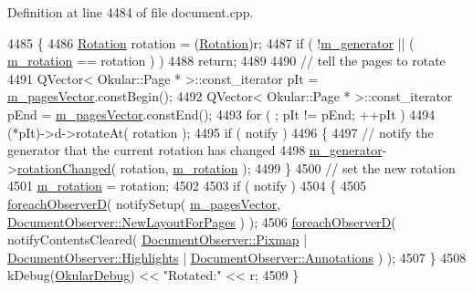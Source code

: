 Definition at line 4484 of file document.\+cpp.


\begin{DoxyCode}
4485 \{
4486     \hyperlink{namespaceOkular_a8556d00465f61ef533c6b027669e7da6}{Rotation} rotation = (\hyperlink{namespaceOkular_a8556d00465f61ef533c6b027669e7da6}{Rotation})r;
4487     \textcolor{keywordflow}{if} ( !\hyperlink{classOkular_1_1DocumentPrivate_a52083f79ce95756ddea060e74315e91f}{m\_generator} || ( \hyperlink{classOkular_1_1DocumentPrivate_a5b7f4c2b5937d311b277c2e90826ee1b}{m\_rotation} == rotation ) )
4488     \textcolor{keywordflow}{return};
4489 
4490     \textcolor{comment}{// tell the pages to rotate}
4491     QVector< Okular::Page * >::const\_iterator pIt = \hyperlink{classOkular_1_1DocumentPrivate_a73b852d9a73ffe8061b66dbf9b290f17}{m\_pagesVector}.constBegin();
4492     QVector< Okular::Page * >::const\_iterator pEnd = \hyperlink{classOkular_1_1DocumentPrivate_a73b852d9a73ffe8061b66dbf9b290f17}{m\_pagesVector}.constEnd();
4493     \textcolor{keywordflow}{for} ( ; pIt != pEnd; ++pIt )
4494         (*pIt)->d->rotateAt( rotation );
4495     \textcolor{keywordflow}{if} ( notify )
4496     \{
4497         \textcolor{comment}{// notify the generator that the current rotation has changed}
4498         \hyperlink{classOkular_1_1DocumentPrivate_a52083f79ce95756ddea060e74315e91f}{m\_generator}->\hyperlink{classOkular_1_1Generator_a46e155b74cccf91f48ad58eafcc7a716}{rotationChanged}( rotation, 
      \hyperlink{classOkular_1_1DocumentPrivate_a5b7f4c2b5937d311b277c2e90826ee1b}{m\_rotation} );
4499     \}
4500     \textcolor{comment}{// set the new rotation}
4501     \hyperlink{classOkular_1_1DocumentPrivate_a5b7f4c2b5937d311b277c2e90826ee1b}{m\_rotation} = rotation;
4502 
4503     \textcolor{keywordflow}{if} ( notify )
4504     \{
4505         \hyperlink{core_2document_8cpp_a213572010703f4fcbc3229b09d665d3c}{foreachObserverD}( notifySetup( \hyperlink{classOkular_1_1DocumentPrivate_a73b852d9a73ffe8061b66dbf9b290f17}{m\_pagesVector}, 
      \hyperlink{classOkular_1_1DocumentObserver_aba00584af99894f95a9650e91f109d40a053812331fcd35ccec8538c45d209799}{DocumentObserver::NewLayoutForPages} ) );
4506         \hyperlink{core_2document_8cpp_a213572010703f4fcbc3229b09d665d3c}{foreachObserverD}( notifyContentsCleared( 
      \hyperlink{classOkular_1_1DocumentObserver_af0e6b09d5fc7ecb673bd4895ef2710dca3263576701c6ec7dc0a8e8945054db56}{DocumentObserver::Pixmap} | \hyperlink{classOkular_1_1DocumentObserver_af0e6b09d5fc7ecb673bd4895ef2710dcac6ac9d40408f28401cdde8b2e57c3afc}{DocumentObserver::Highlights}
       | \hyperlink{classOkular_1_1DocumentObserver_af0e6b09d5fc7ecb673bd4895ef2710dca05bd23206e8303026c0b598095d8552e}{DocumentObserver::Annotations} ) );
4507     \}
4508     kDebug(\hyperlink{debug__p_8h_af16c6e32a95969dd0605d792ec9807c7}{OkularDebug}) << \textcolor{stringliteral}{"Rotated:"} << r;
4509 \}
\end{DoxyCode}
